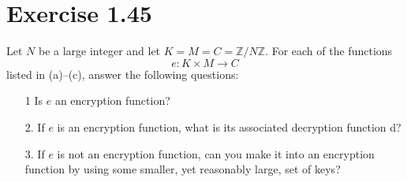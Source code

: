 \documentclass[12pt]{ut-thesis}
\theoremstyle{definition}
\begin{document}
	\section*{Exercise 1.45}
    Let $N$ be a large integer and let $K = M = C = \mathbb{Z}/N\mathbb{Z}$. 
    For each of the functions $$e : K \times M \rightarrow C$$
    listed in (a)–(c), answer the following questions:
    \begin{itemize}
        \item[1] Is $e$ an encryption function?
        \item[2.] If $e$ is an encryption function, what is its associated decryption function d?
        \item[3.] If $e$ is not an encryption function, can you make it into an encryption 
        function by using some smaller, yet reasonably large, set of keys?    
    \end{itemize}
\end{document}
